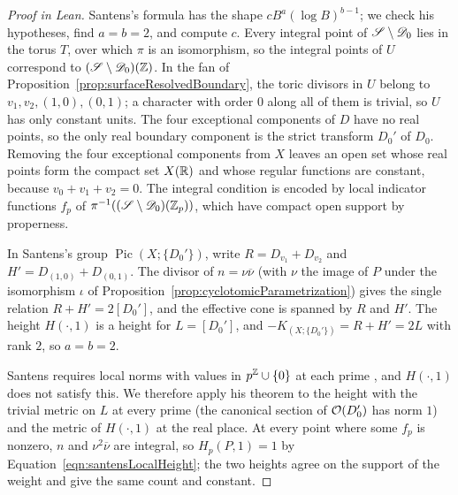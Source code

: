 \begin{proof}[Proof in Lean]

\leanok


Santens's formula has the shape $cB^a(\log B)^{b-1}$; we check his hypotheses, find $a=b=2$, and compute $c$. Every integral point of $\mathscr{S}\setminus\mathscr{D}_0$ lies in the torus $T$, over which $\pi$ is an isomorphism, so the integral points of $U$ correspond to $(\mathscr{S}\setminus\mathscr{D}_0)(\mathbb{Z})$. In the fan of Proposition~\ref{prop:surfaceResolvedBoundary}, the toric divisors in $U$ belong to $v_1,v_2,(1,0),(0,1)$; a character with order $0$ along all of them is trivial, so $U$ has only constant units. The four exceptional components of $D$ have no real points, so the only real boundary component is the strict transform $D_0'$ of $D_0$. Removing the four exceptional components from $X$ leaves an open set whose real points form the compact set $X(\mathbb{R})$ and whose regular functions are constant, because $v_0+v_1+v_2=0$. The integral condition is encoded by local indicator functions $f_p$ of $\pi^{-1}((\mathscr{S}\setminus\mathscr{D}_0)(\mathbb{Z}_p))$, which have compact open support by properness.

In Santens's group $\operatorname{Pic}(X;\{D_0'\})$, write $R=D_{v_1}+D_{v_2}$ and $H'=D_{(1,0)}+D_{(0,1)}$. The divisor of $n=\nu\overline\nu$ (with $\nu$ the image of $P$ under the isomorphism $\iota$ of Proposition~\ref{prop:cyclotomicParametrization}) gives the single relation $R+H'=2[D_0']$, and the effective cone is spanned by $R$ and $H'$. The height $H(\cdot,1)$ is a height for $L=[D_0']$, and $-K_{(X;\{D_0'\})}=R+H'=2L$ with rank $2$, so $a=b=2$.

Santens requires local norms with values in $p^{\mathbb{Z}}\cup\{0\}$ at each prime \cite[Definition~4.1]{santens2023integral}, and $H(\cdot,1)$ does not satisfy this. We therefore apply his theorem to the height with the trivial metric on $L$ at every prime (the canonical section of $\mathcal{O}(D_0')$ has norm $1$) and the metric of $H(\cdot,1)$ at the real place. At every point where some $f_p$ is nonzero, $n$ and $\nu^2\overline\nu$ are integral, so $H_p(P,1)=1$ by Equation~\ref{eqn:santensLocalHeight}; the two heights agree on the support of the weight and give the same count and constant.


\end{proof}
